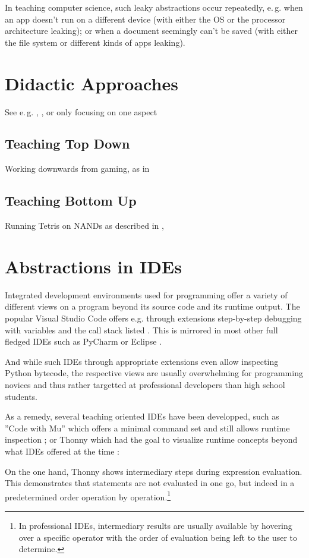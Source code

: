 In teaching computer science, such leaky abstractions occur repeatedly, e.\,g. when an app doesn't run on a different device (with either the OS or the processor architecture leaking); or when a document seemingly can't be saved (with either the file system or different kinds of apps leaking).



\section{Didactic Approaches} \label{sc_didactic}
See e.\,g. \cite{Sch11}, \cite{Mod16}, \cite{Har20} or \cite{Lee20} only focusing on one aspect

\subsection{Teaching Top Down}
Working downwards from gaming, as in \cite{Wei16}

\subsection{Teaching Bottom Up}
Running Tetris on NANDs as described in \cite{Cak17}, \cite{Nis21}


\section{Abstractions in IDEs} \label{sc_ides}
Integrated development environments used for programming offer a variety of different views on a program beyond its source code and its runtime output. The popular Visual Studio Code offers e.g. through extensions step-by-step debugging with variables and the call stack listed \cite{Mic25}. This is mirrored in most other full fledged IDEs such as PyCharm \citep{Jet25} or Eclipse \citep{Ecl25}.

And while such IDEs through appropriate extensions even allow inspecting Python bytecode, the respective views are usually overwhelming for programming novices and thus rather targetted at professional developers than high school students.

As a remedy, several teaching oriented IDEs have been developped, such as ''Code with Mu'' which offers a minimal command set and still allows runtime inspection \citep{Tol23}; or Thonny which had the goal to visualize runtime concepts beyond what IDEs offered at the time \citep[p. 119]{Ann15}:

On the one hand, Thonny shows intermediary steps during expression evaluation. This demonstrates that statements are not evaluated in one go, but indeed in a predetermined order operation by operation.\footnote{In professional IDEs, intermediary results are usually available by hovering over a specific operator with the order of evaluation being left to the user to determine.}

